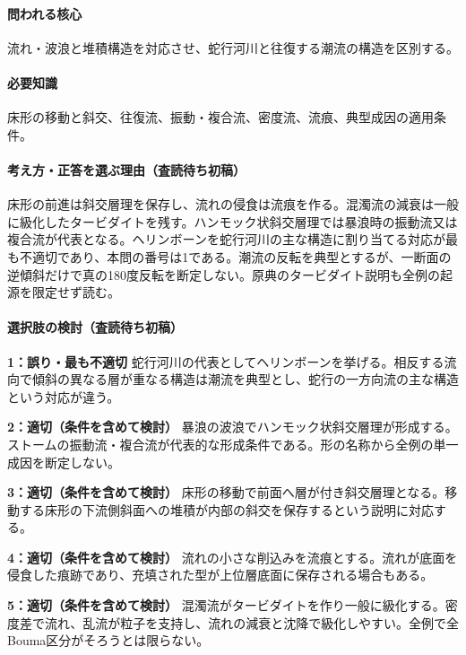\paragraph{問われる核心} 流れ・波浪と堆積構造を対応させ、蛇行河川と往復する潮流の構造を区別する。

\paragraph{必要知識} 床形の移動と斜交、往復流、振動・複合流、密度流、流痕、典型成因の適用条件。

\paragraph{考え方・正答を選ぶ理由（査読待ち初稿）} 床形の前進は斜交層理を保存し、流れの侵食は流痕を作る。混濁流の減衰は一般に級化したタービダイトを残す。ハンモック状斜交層理では暴浪時の振動流又は複合流が代表となる。ヘリンボーンを蛇行河川の主な構造に割り当てる対応が最も不適切であり、本問の番号は1である。潮流の反転を典型とするが、一断面の逆傾斜だけで真の180度反転を断定しない。原典のタービダイト説明も全例の起源を限定せず読む。

\paragraph{選択肢の検討（査読待ち初稿）}\mbox{}\par

\noindent\textbf{1：誤り・最も不適切} 蛇行河川の代表としてヘリンボーンを挙げる。相反する流向で傾斜の異なる層が重なる構造は潮流を典型とし、蛇行の一方向流の主な構造という対応が違う。\par

\noindent\textbf{2：適切（条件を含めて検討）} 暴浪の波浪でハンモック状斜交層理が形成する。ストームの振動流・複合流が代表的な形成条件である。形の名称から全例の単一成因を断定しない。\par

\noindent\textbf{3：適切（条件を含めて検討）} 床形の移動で前面へ層が付き斜交層理となる。移動する床形の下流側斜面への堆積が内部の斜交を保存するという説明に対応する。\par

\noindent\textbf{4：適切（条件を含めて検討）} 流れの小さな削込みを流痕とする。流れが底面を侵食した痕跡であり、充填された型が上位層底面に保存される場合もある。\par

\noindent\textbf{5：適切（条件を含めて検討）} 混濁流がタービダイトを作り一般に級化する。密度差で流れ、乱流が粒子を支持し、流れの減衰と沈降で級化しやすい。全例で全Bouma区分がそろうとは限らない。\par

